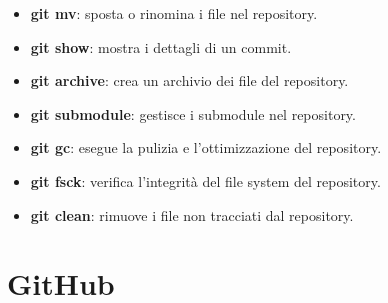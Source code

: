 \documentclass{article}
\begin{document}
\begin{itemize}
    \item \textbf{git mv}: sposta o rinomina i file nel repository.
    \item \textbf{git show}: mostra i dettagli di un commit.
    \item \textbf{git archive}: crea un archivio dei file del repository.
    \item \textbf{git submodule}: gestisce i submodule nel repository.
    \item \textbf{git gc}: esegue la pulizia e l'ottimizzazione del repository.
    \item \textbf{git fsck}: verifica l'integrità del file system del repository.
    \item \textbf{git clean}: rimuove i file non tracciati dal repository.
\end{itemize}
\section{GitHub}
\end{document}
